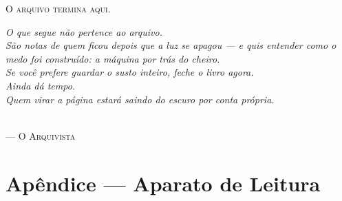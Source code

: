 

\cleardoublepage
\thispagestyle{empty}
\vspace*{\fill}
\begin{center}
{\scshape\large O arquivo termina aqui.}\\[1.6em]

\begin{minipage}{0.82\textwidth}\itshape\centering
O que segue não pertence ao arquivo.\\[0.6em]
São notas de quem ficou depois que a luz se apagou --- e quis entender
\textup{como} o medo foi construído: a máquina por trás do cheiro.\\[0.6em]
Se você prefere guardar o susto inteiro, feche o livro agora.\\[0.3em]
Ainda dá tempo.\\[0.3em]
Quem virar a página estará saindo do escuro por conta própria.
\end{minipage}\\[2.2em]

{\scshape --- O Arquivista}
\end{center}
\vspace*{\fill}
\clearpage

\cleardoublepage
\pagecolor{white}
\color{black}
\pagestyle{plain}

\chapter*{Apêndice --- Aparato de Leitura}

